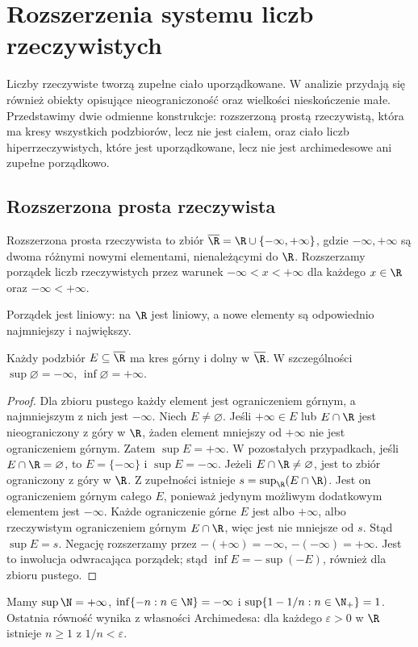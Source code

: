 \chapter{Rozszerzenia systemu liczb rzeczywistych}
\label{ma1:ch:real-extensions}

Liczby rzeczywiste tworzą zupełne ciało uporządkowane. W analizie przydają się również obiekty opisujące nieograniczoność oraz wielkości nieskończenie małe. Przedstawimy dwie odmienne konstrukcje: rozszerzoną prostą rzeczywistą, która ma kresy wszystkich podzbiorów, lecz nie jest ciałem, oraz ciało liczb hiperrzeczywistych, które jest uporządkowane, lecz nie jest archimedesowe ani zupełne porządkowo.

\section{Rozszerzona prosta rzeczywista}
\begin{definicja}
\label{ma1:def:extended-real-line}
Rozszerzona prosta rzeczywista to zbiór $\overline{\R}=\R\cup\{-\infty,+\infty\}$, gdzie $-\infty,+\infty$ są dwoma różnymi nowymi elementami, nienależącymi do $\R$. Rozszerzamy porządek liczb rzeczywistych przez warunek $-\infty<x<+\infty$ dla każdego $x\in\R$ oraz $-\infty<+\infty$.
\end{definicja}
Porządek jest liniowy: na $\R$ jest liniowy, a nowe elementy są odpowiednio najmniejszy i największy.

\begin{twierdzenie}
\label{ma1:thm:extended-complete}
Każdy podzbiór $E\subseteq\overline{\R}$ ma kres górny i dolny w $\overline{\R}$. W szczególności $\sup\varnothing=-\infty$, $\inf\varnothing=+\infty$.
\end{twierdzenie}
\begin{proof}
Dla zbioru pustego każdy element jest ograniczeniem górnym, a najmniejszym z nich jest $-\infty$. Niech $E\ne\varnothing$. Jeśli $+\infty\in E$ lub $E\cap\R$ jest nieograniczony z góry w $\R$, żaden element mniejszy od $+\infty$ nie jest ograniczeniem górnym. Zatem $\sup E=+\infty$.
W pozostałych przypadkach, jeśli $E\cap\R=\varnothing$, to $E=\{-\infty\}$ i $\sup E=-\infty$. Jeżeli $E\cap\R\ne\varnothing$, jest to zbiór ograniczony z góry w $\R$. Z zupełności istnieje $s=\sup_{\R}(E\cap\R)$. Jest on ograniczeniem górnym całego $E$, ponieważ jedynym możliwym dodatkowym elementem jest $-\infty$. Każde ograniczenie górne $E$ jest albo $+\infty$, albo rzeczywistym ograniczeniem górnym $E\cap\R$, więc jest nie mniejsze od $s$. Stąd $\sup E=s$.
Negację rozszerzamy przez $-(+\infty)=-\infty$, $-(-\infty)=+\infty$. Jest to inwolucja odwracająca porządek; stąd $\inf E=-\sup(-E)$, również dla zbioru pustego.
\end{proof}
\begin{przyklad}
Mamy $\sup\N=+\infty$, $\inf\{-n:n\in\N\}=-\infty$ i $\sup\{1-1/n:n\in\N_+\}=1$. Ostatnia równość wynika z własności Archimedesa: dla każdego $\varepsilon>0$ w $\R$ istnieje $n\ge1$ z $1/n<\varepsilon$.
\end{przyklad}


